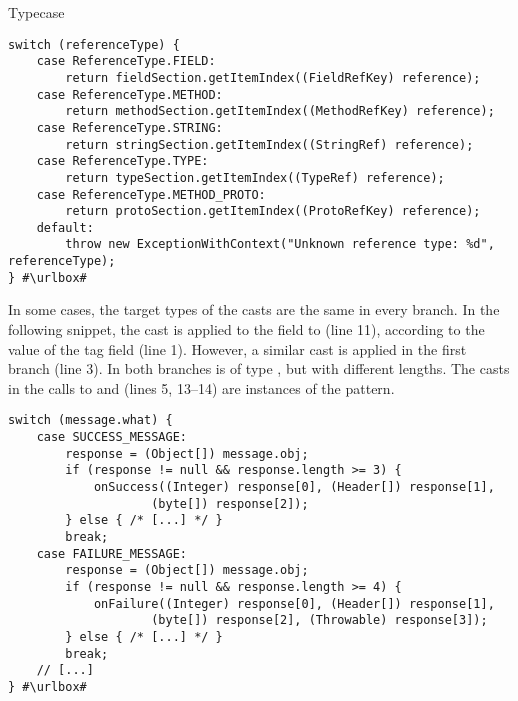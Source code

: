 \begin{pattern}{Typecase}
\def\urlvar{http://bit.ly/JesusFreke_smali_2Ho8bVL}
\begin{verbatim}
switch (referenceType) {
    case ReferenceType.FIELD:
        return fieldSection.getItemIndex((FieldRefKey) reference);
    case ReferenceType.METHOD:
        return methodSection.getItemIndex((MethodRefKey) reference);
    case ReferenceType.STRING:
        return stringSection.getItemIndex((StringRef) reference);
    case ReferenceType.TYPE:
        return typeSection.getItemIndex((TypeRef) reference);
    case ReferenceType.METHOD_PROTO:
        return protoSection.getItemIndex((ProtoRefKey) reference);
    default:
        throw new ExceptionWithContext("Unknown reference type: %d", referenceType);
} #\urlbox#
\end{verbatim}

In some cases, the target types of the casts are the same in every branch.
In the following snippet,
the cast is applied to the  field to (line 11),
according to the value of the tag  field (line 1).
However, a similar cast is applied in the first branch (line 3).
In both branches  is of type ,
but with different lengths.
The casts in the calls to  and
 (lines 5, 13--14)
are instances of the  pattern.

\def\urlvar{http://bit.ly/loopj_android_async_http_2IpIULk}
\begin{verbatim}
switch (message.what) {
    case SUCCESS_MESSAGE:
        response = (Object[]) message.obj;
        if (response != null && response.length >= 3) {
            onSuccess((Integer) response[0], (Header[]) response[1],
					(byte[]) response[2]);
        } else { /* [...] */ }
        break;
    case FAILURE_MESSAGE:
        response = (Object[]) message.obj;
        if (response != null && response.length >= 4) {
            onFailure((Integer) response[0], (Header[]) response[1],
                    (byte[]) response[2], (Throwable) response[3]);
        } else { /* [...] */ }
        break;
    // [...]
} #\urlbox#
\end{verbatim}


\end{pattern}
